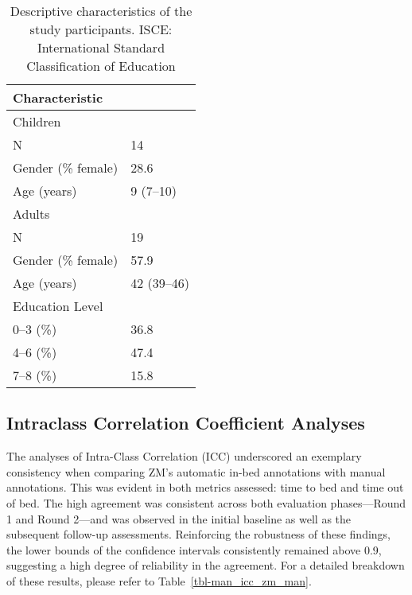 \documentclass[
  10pt,
]{scrbook}
\begin{document}
\hypertarget{tbl-man_describe}{}
\begin{longtable}{ll}
\caption{\label{tbl-man_describe}Descriptive characteristics of the study participants. ISCE:
International Standard Classification of Education }\tabularnewline

\toprule
Characteristic &  \\ 
\midrule
\multicolumn{2}{l}{Children} \\ 
\midrule
N & 14 \\ 
Gender (\% female) & 28.6 \\ 
Age (years) & 9 (7–10) \\ 
\midrule
\multicolumn{2}{l}{Adults} \\ 
\midrule
N & 19 \\ 
Gender (\% female) & 57.9 \\ 
Age (years) & 42 (39–46) \\ 
Education Level &  \\ 
0–3 (\%) & 36.8 \\ 
4–6 (\%) & 47.4 \\ 
7–8 (\%) & 15.8 \\ 
\bottomrule
\end{longtable}

\endgroup

\hypertarget{intraclass-correlation-coefficient-analyses}{%
\subsection{Intraclass Correlation Coefficient
Analyses}\label{intraclass-correlation-coefficient-analyses}}

The analyses of Intra-Class Correlation (ICC) underscored an exemplary
consistency when comparing ZM's automatic in-bed annotations with manual
annotations. This was evident in both metrics assessed: time to bed and
time out of bed. The high agreement was consistent across both
evaluation phases---Round 1 and Round 2---and was observed in the
initial baseline as well as the subsequent follow-up assessments.
Reinforcing the robustness of these findings, the lower bounds of the
confidence intervals consistently remained above 0.9, suggesting a high
degree of reliability in the agreement. For a detailed breakdown of
these results, please refer to Table~\ref{tbl-man_icc_zm_man}.

\newpage

\begingroup

\footnotesize
\end{document}
